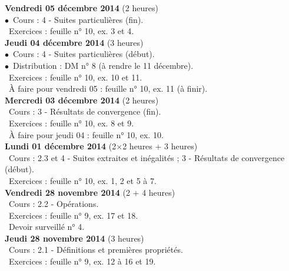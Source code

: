 \documentclass[12pt,a4paper]{article}
\begin{document}
\noindent\textbf{ \bf Vendredi 05 décembre 2014 \rm}(2 heures)\\
$\bullet$\ Cours : 4 - Suites particulières (fin).\\
\bu\ Exercices : feuille n° 10, ex. 3 et 4.\vspace{.4cm}\\

\noindent\textbf{ \bf Jeudi 04 décembre 2014 \rm}(3 heures)\\
$\bullet$\ Cours : 4 - Suites particulières (début).\\
$\bullet$\ Distribution : DM n° 8 (à rendre le 11 décembre).\\
\bu\ Exercices : feuille n° 10, ex. 10 et 11.\\
\bu\ À faire pour vendredi 05 : feuille n° 10, ex. 11 (à finir).\vspace{.4cm}\\

\noindent\textbf{\bf Mercredi 03 décembre 2014 \rm} (2 heures)\\
\bu\ Cours : 3 - Résultats de convergence (fin).\\
\bu\ Exercices : feuille n° 10, ex. 8 et 9.\\
\bu\ À faire pour jeudi 04 : feuille n° 10, ex. 10.\vspace{.4cm}\\

\noindent\textbf{ Lundi 01 décembre 2014 \rm} (2$\times$2 heures + 3 heures)\\
\bu\ Cours : 2.3 et 4 - Suites extraites et inégalités ; 3 - Résultats de convergence (début).\\
\bu\ Exercices : feuille n° 10, ex. 1, 2 et 5 à 7.\vspace{.4cm}\\

\noindent\textbf{ \bf Vendredi 28 novembre 2014 \rm}(2 + 4 heures)\\
\bu\ Cours : 2.2 - Opérations.\\
\bu\ Exercices : feuille n° 9, ex. 17 et 
18.\\
\bu\ Devoir surveillé n° 4.\vspace{.4cm}\\

\noindent\textbf{ \bf Jeudi 28 novembre 2014 \rm}(3 heures)\\
\bu\ Cours : 2.1 - Définitions et 
premières propriétés.\\
\bu\ Exercices : feuille n° 9, ex. 12 à 16 et 
19.\vspace{.4cm}\\
 
\end{document}

